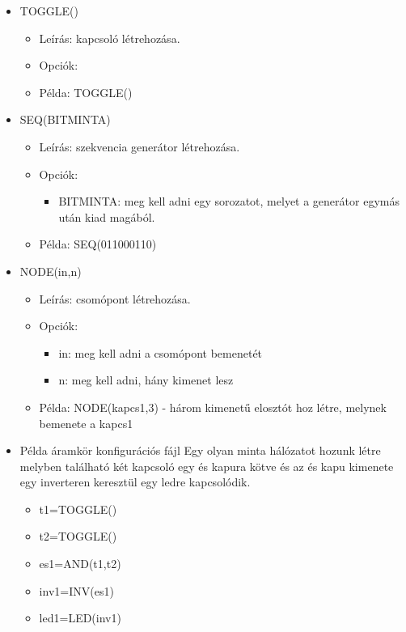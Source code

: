 \begin{itemize}
\item TOGGLE()
	\begin{itemize}
	\item Leírás: kapcsoló létrehozása.
	\item Opciók: 
		\begin{itemize}
		\end{itemize}
	\item Példa: TOGGLE()
	\end{itemize}		

\item SEQ(BITMINTA)
	\begin{itemize}
	\item Leírás: szekvencia generátor létrehozása.
	\item Opciók: 
		\begin{itemize}
			\item BITMINTA: meg kell adni egy sorozatot, melyet a generátor egymás után kiad magából.
		\end{itemize}
	\item Példa: SEQ(011000110)
	\end{itemize}

\item NODE(in,n)
	\begin{itemize}
	\item Leírás: csomópont létrehozása.
	\item Opciók: 
		\begin{itemize}
			\item in: meg kell adni a csomópont bemenetét
			\item n: meg kell adni, hány kimenet lesz
		\end{itemize}
	\item Példa: NODE(kapcs1,3) - három kimenetű elosztót hoz létre, melynek bemenete a kapcs1
	\end{itemize}
	
\item Példa áramkör konfigurációs fájl
Egy olyan minta hálózatot hozunk létre melyben található két kapcsoló egy és kapura kötve és az és kapu kimenete egy inverteren keresztül egy ledre kapcsolódik.
	\begin{itemize}
	\item t1=TOGGLE()
	\item t2=TOGGLE()
	\item es1=AND(t1,t2)	
	\item inv1=INV(es1)
	\item led1=LED(inv1)
	\end{itemize}	


\end{itemize}

